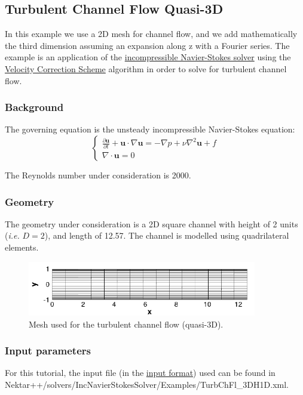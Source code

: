 \subsection{Turbulent Channel Flow Quasi-3D}
In this example we use a 2D mesh for channel flow, and we add mathematically the third dimension assuming an expansion along z with a Fourier series. The example is an application of the \hyperref[IncNSsolver]{incompressible Navier-Stokes solver} using the \hyperref[VCSscheme]{Velocity Correction Scheme} algorithm in order to solve for turbulent channel flow.

\subsubsection{Background}
The governing equation is the unsteady incompressible Navier-Stokes equation:
\begin{equation}
\begin{cases}
\frac{\partial \textbf{u}}{\partial t} + \textbf{u} \cdot \nabla \textbf{u} = - \nabla p + \nu \nabla^2 \textbf{u} + f \\
\nabla \cdot \textbf{u} = 0
\label{IncNS_equations}
\end{cases}
\end{equation}

The Reynolds number under consideration is 2000.

\subsubsection{Geometry}
The geometry under consideration is a 2D square channel with height of 2 units (\textit{i.e.} $D=2$), and length of 12.57. The channel is modelled using quadrilateral elements.
\begin{figure}
\begin{center}
\includegraphics[width=10cm]{Figures/ChanMesh.png}
\caption{Mesh used for the turbulent channel flow (quasi-3D).}
\end{center}
\end{figure}

\subsubsection{Input parameters}
For this tutorial, the input file (in the \hyperref[XMLformat]{\nekpp input format}) used can be found in Nektar++/solvers/IncNavierStokesSolver/Examples/TurbChFl\_3DH1D.xml.

